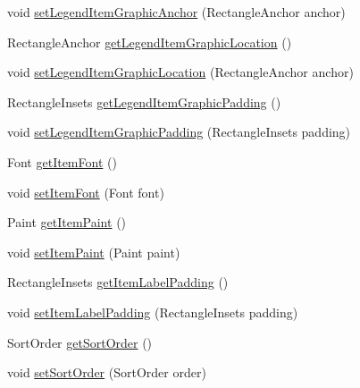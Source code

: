 \begin{DoxyCompactItemize}
\item 
void \mbox{\hyperlink{classorg_1_1jfree_1_1chart_1_1title_1_1_legend_title_a4454b9d8f93d0f47ded800544f85cda0}{set\+Legend\+Item\+Graphic\+Anchor}} (Rectangle\+Anchor anchor)
\item 
Rectangle\+Anchor \mbox{\hyperlink{classorg_1_1jfree_1_1chart_1_1title_1_1_legend_title_aa099b193648eca716d8e7119481caf3e}{get\+Legend\+Item\+Graphic\+Location}} ()
\item 
void \mbox{\hyperlink{classorg_1_1jfree_1_1chart_1_1title_1_1_legend_title_a8f4fd48fedee4f8bc5cd15762e4dde96}{set\+Legend\+Item\+Graphic\+Location}} (Rectangle\+Anchor anchor)
\item 
Rectangle\+Insets \mbox{\hyperlink{classorg_1_1jfree_1_1chart_1_1title_1_1_legend_title_a6582d6bccf3b31cf91abdf47deb53f51}{get\+Legend\+Item\+Graphic\+Padding}} ()
\item 
void \mbox{\hyperlink{classorg_1_1jfree_1_1chart_1_1title_1_1_legend_title_a00c3d29c97cdc18a4b161035ef14750e}{set\+Legend\+Item\+Graphic\+Padding}} (Rectangle\+Insets padding)
\item 
Font \mbox{\hyperlink{classorg_1_1jfree_1_1chart_1_1title_1_1_legend_title_a15c2055d895605a280bde71abeb64dfd}{get\+Item\+Font}} ()
\item 
void \mbox{\hyperlink{classorg_1_1jfree_1_1chart_1_1title_1_1_legend_title_a696e75d03f7fe2a814b454710a0fe4af}{set\+Item\+Font}} (Font font)
\item 
Paint \mbox{\hyperlink{classorg_1_1jfree_1_1chart_1_1title_1_1_legend_title_a72d9f65611674f71e3da6633b18ea1af}{get\+Item\+Paint}} ()
\item 
void \mbox{\hyperlink{classorg_1_1jfree_1_1chart_1_1title_1_1_legend_title_a547497bcb3e5aa257ccb3c6e0896dcf2}{set\+Item\+Paint}} (Paint paint)
\item 
Rectangle\+Insets \mbox{\hyperlink{classorg_1_1jfree_1_1chart_1_1title_1_1_legend_title_af7c5e60de12ff6c675c8ffe880a06e1a}{get\+Item\+Label\+Padding}} ()
\item 
void \mbox{\hyperlink{classorg_1_1jfree_1_1chart_1_1title_1_1_legend_title_abbaecf02a0152b5f92dbc5b0ccfa3c53}{set\+Item\+Label\+Padding}} (Rectangle\+Insets padding)
\item 
Sort\+Order \mbox{\hyperlink{classorg_1_1jfree_1_1chart_1_1title_1_1_legend_title_a1b57dc9956b90cdd8d71a742715435fc}{get\+Sort\+Order}} ()
\item 
void \mbox{\hyperlink{classorg_1_1jfree_1_1chart_1_1title_1_1_legend_title_a04219301646c45796f645882a3bd187f}{set\+Sort\+Order}} (Sort\+Order order)

\end{DoxyCompactItemize}
